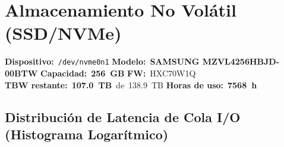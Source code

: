 \documentclass[11pt, a4paper, final]{article}
\newcommand{\mv}[1]{\textcolor{AMPrimary}{\textbf{#1}}}
\begin{document}
\newpage


\section{Almacenamiento No Volátil (SSD/NVMe)}

\begin{componentinfo}
  \small
  \textbf{Dispositivo:}\ \texttt{/dev/nvme0n1}\hfill
  \textbf{Modelo:}\ \mv{SAMSUNG MZVL4256HBJD-00BTW}\hfill
  \textbf{Capacidad:}\ \mv{256\ GB}\hfill
  \textbf{FW:}\ HXC70W1Q\\
  \textbf{TBW restante:}\ \mv{107.0\ TB}\ de\ 138.9\ TB\hfill
  \textbf{Horas de uso:}\ \mv{7568\ h}
\end{componentinfo}

\vspace{0.5cm}


%
%
\subsection{Distribución de Latencia de Cola I/O (Histograma Logarítmico)}
\end{document}
